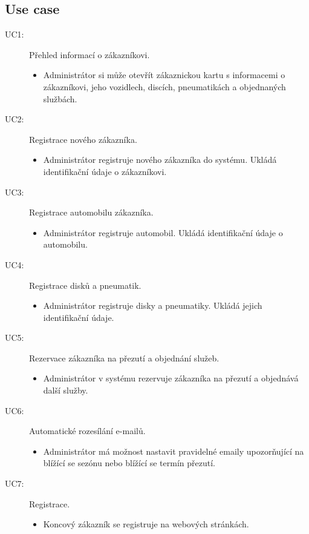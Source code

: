 \subsection{Use case}
\begin{description}
    \item [UC1:] Přehled informací o zákazníkovi.
    \begin{itemize}
        \item Administrátor si může otevřít zákaznickou kartu s informacemi o zákazníkovi, jeho vozidlech, discích, pneumatikách a objednaných službách.
    \end{itemize}
    \item [UC2:] Registrace nového zákazníka. 
    \begin{itemize}
        \item Administrátor registruje nového zákazníka do systému. Ukládá identifikační údaje o zákazníkovi.
    \end{itemize}
    \item [UC3:] Registrace automobilu zákazníka. 
    \begin{itemize}
        \item Administrátor registruje automobil. Ukládá identifikační údaje o automobilu. 
    \end{itemize}
    \item [UC4:] Registrace disků a pneumatik.
    \begin{itemize}
        \item Administrátor registruje disky a pneumatiky. Ukládá jejich identifikační údaje.
    \end{itemize}
    \item [UC5:] Rezervace zákazníka na přezutí a objednání služeb.
    \begin{itemize}
        \item Administrátor v systému rezervuje zákazníka na přezutí a objednává další služby. 
    \end{itemize}
    \item [UC6:] Automatické rozesílání e-mailů.
    \begin{itemize}
        \item Administrátor má možnost nastavit pravidelné emaily upozorňující na blížící se sezónu nebo blížící se termín přezutí. 
    \end{itemize}
    \item [UC7:] Registrace.
    \begin{itemize}
        \item Koncový zákazník se registruje na webových stránkách. 

\end{itemize}
\end{description}
